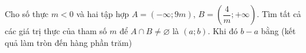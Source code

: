 \begin{ex}
Cho số thực $m<0$ và hai tập hợp $A=(-\infty;9m)$, $B=\left(\dfrac4m;+\infty\right)$. Tìm tất cả các giá trị thực của tham số $m$ để $A\cap B\ne\varnothing$ là $(a;b)$. Khi đó $b-a$ bằng (kết quả làm tròn đến hàng phần trăm)
\end{ex}
